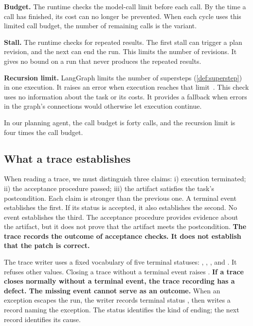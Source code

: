 \bi

\item \textbf{Budget.} The runtime checks the model-call limit before each call. By the time a call
has finished, its cost can no longer be prevented. When each cycle uses this limited call budget,
the number of remaining calls is the variant.

\item \textbf{Stall.} The runtime checks for repeated results. The first stall can trigger a plan
revision, and the next can end the run. This limits the number of revisions. It gives no bound on
a run that never produces the repeated results.

\item \textbf{Recursion limit.} LangGraph limits the number of supersteps
(\cref{def:superstep}) in one execution. It raises an error when execution reaches that
limit~\citep{langgraph-graph-api}. This check uses no information about the task or its costs.
It provides a fallback when errors in the graph's connections would otherwise let execution continue.

\ei

\noindent In our planning agent, the call budget is forty calls, and the recursion limit is four times the
call budget.

\subsection{What a trace establishes}
\label{sec:control-termination}

When reading a trace, we must distinguish three claims: i) execution terminated; ii) the acceptance
procedure passed; iii) the artifact satisfies the task's postcondition. Each claim is stronger
than the previous one. A terminal event establishes the first. If its status is accepted, it also
establishes the second. No event establishes the third. The acceptance procedure provides evidence
about the artifact, but it does not prove that the artifact meets the postcondition.
\textbf{The trace records the outcome of acceptance checks. It does not establish that the patch
is correct.}

The trace writer uses a fixed vocabulary of five terminal statuses:
, , ,  and
. It refuses other values. Closing a trace without a terminal event raises
. \textbf{If a trace closes normally without a terminal event, the trace
recording has a defect. The missing event cannot serve as an outcome.} When an exception escapes
the run, the writer records terminal status , then writes a record naming the
exception. The status identifies the kind of ending; the next record identifies its cause.

